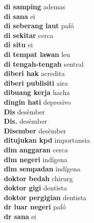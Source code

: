 \textbf{ di samping  } ademas \\
\textbf{ di sana  } ei \\
\textbf{ di seberang laut  } pafó \\
\textbf{ di sekitar  } cerca \\
\textbf{ di situ  } ei \\
\textbf{ di tempat lawan  } leu \\
\textbf{ di tengah-tengah  } sentral \\
\textbf{ diberi hak  } acredita \\
\textbf{ diberi publisiti  } aira \\
\textbf{ dibuang kerja  } hacha \\
\textbf{ dingin hati  } depresivo \\
\textbf{ Dis  } desèmber \\
\textbf{ Dis.  } desèmber \\
\textbf{ Disember  } desèmber \\
\textbf{ ditujukan kpd  } importansia \\
\textbf{ dlm anggaran  } cerca \\
\textbf{ dlm negeri  } indígena \\
\textbf{ dlm sempadan  } indígena \\
\textbf{ doktor bedah  } chirurg \\
\textbf{ doktor gigi  } dentista \\
\textbf{ doktor pergigian  } dentista \\
\textbf{ dr luar negeri  } pafó \\
\textbf{ dr sana  } ei \\
